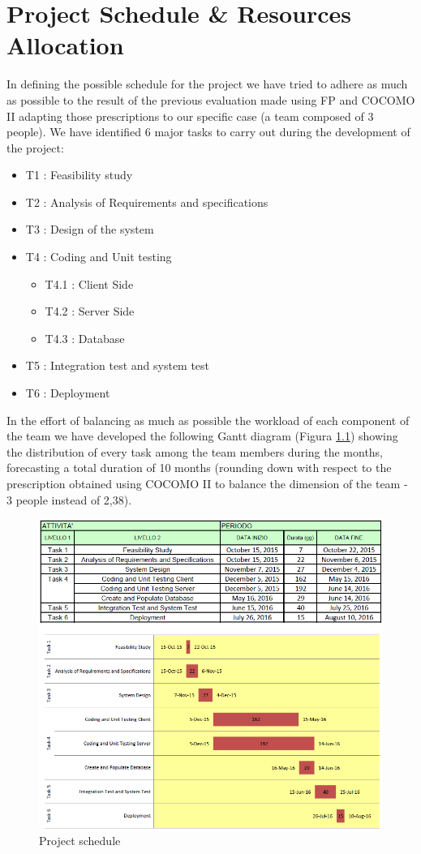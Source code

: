 \chapter{Project Schedule \& Resources Allocation} \label{chap4}
In defining the possible schedule for the project we have tried to adhere as much as possible to the result of the previous evaluation made using FP and COCOMO II adapting those prescriptions to our specific case (a team composed of 3 people).
We have identified 6 major tasks to carry out during the development of the project:
\begin{itemize}
	\item T1 : Feasibility study
	\item T2 : Analysis of Requirements and specifications
	\item T3 : Design of the system
	\item T4 : Coding and Unit testing
	\begin{itemize}
		\item T4.1 : Client Side
		\item T4.2 : Server Side
		\item T4.3 : Database
	\end{itemize}
	\item T5 : Integration test and system test
	\item T6 : Deployment
\end{itemize}
In the effort of balancing as much as possible the workload of each component of the team we have developed the following Gantt diagram (Figura \ref{fig:scheduele}) showing the distribution of every task among the team members during the months, forecasting a total duration of 10 months (rounding down with respect to the prescription obtained using COCOMO II to balance the dimension of the team - 3 people instead of 2,38).

\begin{figure}[!htbp]
\centering
\includegraphics[width=\textwidth]{cpt/img/Schedule}
\caption{Project schedule}
\label{fig:scheduele}
\end{figure}